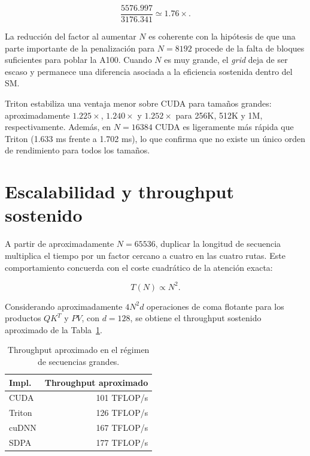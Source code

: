 \begin{equation}
\frac{5576.997}{3176.341}\simeq 1.76\times.
\end{equation}

La reducción del factor al aumentar \(N\) es coherente con la hipótesis de que una parte importante de la penalización para \(N=8192\) procede de la falta de bloques suficientes para poblar la A100. Cuando \(N\) es muy grande, el \textit{grid} deja de ser escaso y permanece una diferencia asociada a la eficiencia sostenida dentro del SM.

Triton estabiliza una ventaja menor sobre CUDA para tamaños grandes: aproximadamente \(1.225\times\), \(1.240\times\) y \(1.252\times\) para 256K, 512K y 1M, respectivamente. Además, en \(N=16384\) CUDA es ligeramente más rápida que Triton (1.633 ms frente a 1.702 ms), lo que confirma que no existe un único orden de rendimiento para todos los tamaños.

\section{Escalabilidad y throughput sostenido}

A partir de aproximadamente \(N=65536\), duplicar la longitud de secuencia multiplica el tiempo por un factor cercano a cuatro en las cuatro rutas. Este comportamiento concuerda con el coste cuadrático de la atención exacta:

\begin{equation}
T(N)\propto N^2.
\end{equation}

Considerando aproximadamente \(4N^2d\) operaciones de coma flotante para los productos \(QK^T\) y \(PV\), con \(d=128\), se obtiene el throughput sostenido aproximado de la Tabla~\ref{tab:tflops_results}.

\begin{table}[H]
\centering
\caption{Throughput aproximado en el régimen de secuencias grandes.}
\label{tab:tflops_results}
\begin{tabular}{lr}
\toprule
\textbf{Impl.} & \textbf{Throughput aproximado} \\
\midrule
CUDA   & 101 TFLOP/s \\
Triton & 126 TFLOP/s \\
cuDNN  & 167 TFLOP/s \\
SDPA   & 177 TFLOP/s \\
\bottomrule
\end{tabular}
\end{table}

